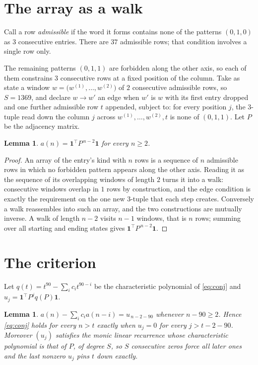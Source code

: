 \documentclass[11pt,a4paper]{article}
\theoremstyle{plain}
\newtheorem{lemma}[theorem]{Lemma}
\theoremstyle{definition}
\begin{document}
\section{The array as a walk}

Call a row \emph{admissible} if the word it forms contains none of the patterns
$(0,1,0)$ as $3$ consecutive entries. There are $37$ admissible rows; that condition
involves a single row only.

The remaining patterns $(0,1,1)$ are forbidden along the other axis, so each of them
constrains $3$ consecutive rows at a fixed position of the column. Take as state a
window $w=\bigl(w^{(1)},\dots,w^{(2)}\bigr)$ of $2$ consecutive admissible
rows, so $S=1369$, and declare $w\to w'$ an edge when $w'$ is $w$ with its first entry
dropped and one further admissible row $t$ appended, subject to: for every position
$j$, the $3$-tuple read down the column $j$ across $w^{(1)},\dots,w^{(2)},t$
is none of $(0,1,1)$. Let $P$ be the adjacency matrix.

\begin{lemma}\label{lem:walk}
$a(n)=\mathbf{1}^{\!\top}P^{\,n-2}\mathbf{1}$ for every $n\ge2$.
\end{lemma}

\begin{proof}
An array of the entry's kind with $n$ rows is a sequence of $n$ admissible rows in
which no forbidden pattern appears along the other axis. Reading it as the sequence of its
overlapping windows of length $2$ turns it into a walk: consecutive windows overlap in
$1$ rows by construction, and the edge condition is exactly the requirement on the one
new $3$-tuple that each step creates. Conversely a walk reassembles into such an array,
and the two constructions are mutually inverse. A walk of length $n-2$ visits $n-1$
windows, that is $n$ rows; summing over all starting and ending states gives
$\mathbf{1}^{\!\top}P^{\,n-2}\mathbf{1}$.
\end{proof}

\section{The criterion}

Let $q(t)=t^{90}-\sum_i c_i t^{90-i}$ be the characteristic polynomial of
\eqref{eq:conj} and $u_j=\mathbf{1}^{\!\top}P^{j}q(P)\mathbf{1}$.

\begin{lemma}\label{lem:crit}
$a(n)-\sum_i c_i a(n-i)=u_{\,n-2-90}$ whenever $n-90\ge2$. Hence
\eqref{eq:conj} holds for every $n>t$ exactly when $u_j=0$ for every
$j>t-2-90$. Moreover $(u_j)$ satisfies the monic linear recurrence whose
characteristic polynomial is that of $P$, of degree $S$, so $S$ consecutive zeros force all
later ones and the last nonzero $u_j$ pins $t$ down exactly.
\end{lemma}
\end{document}
